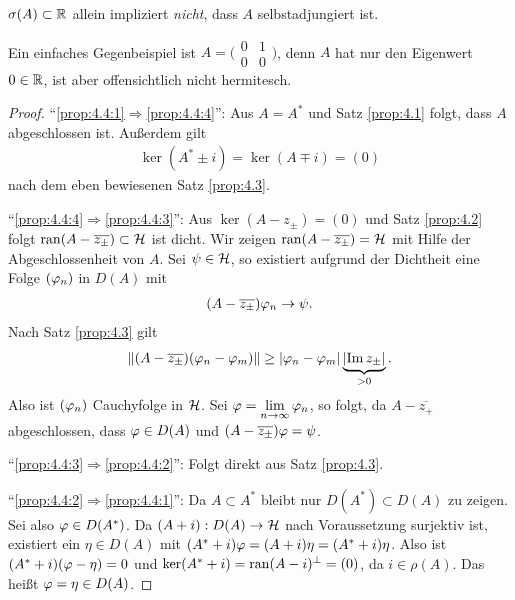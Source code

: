 \begin{bem*}
$\sigma(A)\subset\mathbb{R}$ allein impliziert \textit{nicht}, dass $A$ selbstadjungiert
ist.

Ein einfaches Gegenbeispiel ist $A=\bigl(\begin{smallmatrix}0 & 1\\ 0 &
0\end{smallmatrix}\bigr)$, denn $A$ hat nur den Eigenwert $0\in\mathbb{R}$, ist aber
offensichtlich nicht hermitesch.\maphere
\end{bem*}

\begin{proof}
``\ref{prop:4.4:1}$\Rightarrow$\ref{prop:4.4:4}'': Aus $A=A^*$ und Satz
\ref{prop:4.1} folgt, dass $A$ abgeschlossen ist. Außerdem gilt
\begin{align*}
\ker (A^*\pm i) = \ker (A\mp i) = (0)
\end{align*}
nach dem eben bewiesenen Satz \ref{prop:4.3}.

``\ref{prop:4.4:4}$\Rightarrow$\ref{prop:4.4:3}'': Aus $\ker(A- z_\pm) = (0)$
und Satz \ref{prop:4.2} folgt $\operatorname{ran}(A-\overline{z_\pm}) \subset \mathcal{H}$ ist dicht.
Wir zeigen $\operatorname{ran}(A-\overline{z_\pm}) = \mathcal{H}$ mit Hilfe der Abgeschlossenheit von
$A$. Sei $\psi\in \mathcal{H}$, so existiert aufgrund der Dichtheit eine Folge $(\varphi_n)$
in $D(A)$ mit
\begin{align*}
(A-\overline{z_\pm})\varphi_n \to \psi.
\end{align*}
Nach Satz \ref{prop:4.3} gilt
\begin{align*}
\left\|(A-\overline{z_\pm})(\varphi_n-\varphi_m)\right\| \ge
\left|\varphi_n-\varphi_m\right|\underbrace{\left|\operatorname{Im} z_\pm\right|}_{>0}.
\end{align*}
Also ist $(\varphi_n)$ Cauchyfolge in $\mathcal{H}$. Sei
$\varphi=\lim\limits_{n\to\infty}\varphi_n$, so folgt, da $A-\overline{z_+}$
abgeschlossen, dass $\varphi\in D(A)$ und $(A-\overline{z_\pm})\varphi=\psi$.

``\ref{prop:4.4:3}$\Rightarrow$\ref{prop:4.4:2}'': Folgt direkt aus Satz
\ref{prop:4.3}.

``\ref{prop:4.4:2}$\Rightarrow$\ref{prop:4.4:1}'': Da $A\subset A^*$ bleibt nur
$D(A^*)\subset D(A)$ zu zeigen. Sei also $\varphi\in D(A^*)$.  Da $(A+i): D(A)\to
\mathcal{H}$ nach Voraussetzung surjektiv ist, existiert ein $\eta\in D(A)$ mit
$(A^*+i)\varphi = (A+i)\eta = (A^*+i)\eta$. Also ist $(A^*+i)(\varphi-\eta) = 0$ und
$\ker (A^*+i) = \operatorname{ran}(A-i)^\bot =(0)$, da $i\in\rho(A)$. Das heißt $\varphi=\eta \in
D(A)$.\qedhere
\end{proof}

